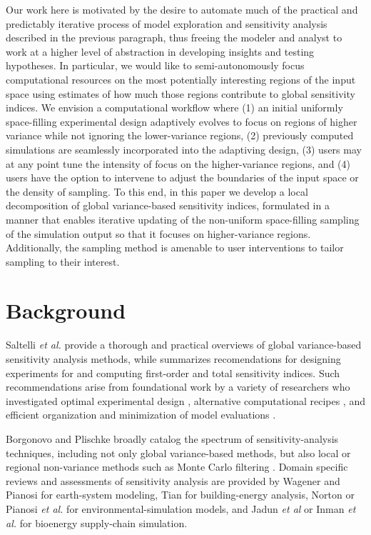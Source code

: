\documentclass[12pt]{article}
\begin{document}
Our work here is motivated by the desire to automate much of the practical and predictably iterative process of model exploration and sensitivity analysis described in the previous paragraph, thus freeing the modeler and analyst to work at a higher level of abstraction in developing insights and testing hypotheses. In particular, we would like to semi-autonomously focus computational resources on the most potentially interesting regions of the input space using estimates of how much those regions contribute to global sensitivity indices. We envision a computational workflow where (1) an initial uniformly space-filling experimental design adaptively evolves to focus on regions of higher variance while not ignoring the lower-variance regions, (2) previously computed simulations are seamlessly incorporated into the adaptiving design, (3) users may at any point tune the intensity of focus on the higher-variance regions, and (4) users have the option to intervene to adjust the boundaries of the input space or the density of sampling. To this end, in this paper we develop a local decomposition of global variance-based sensitivity indices, formulated in a manner that enables iterative updating of the non-uniform space-filling sampling of the simulation output so that it focuses on higher-variance regions. Additionally, the sampling method is amenable to user interventions to tailor sampling to their interest.


\section{Background}
\label{sec:back}

Saltelli \textit{et al.} \cite{saltelli_sensitivity_2004} \cite{saltelli_global_2008} provide a thorough and practical overviews of global variance-based sensitivity analysis methods, while \cite{saltelli_variance_2010} summarizes recomendations for designing experiments for and computing first-order and total sensitivity indices. Such recommendations arise from foundational work by a variety of researchers who investigated optimal experimental design \cite{jansen_analysis_1999} \cite{saltelli_variance_2010}, alternative computational recipes \cite{saltelli_variance_2010}, and efficient organization and minimization of model evaluations \cite{saltelli_making_2002} \cite{piano_new_2019} \cite{kucherenko_estimation_2012}.

Borgonovo and Plischke \cite{borgonovo_sensitivity_2016} broadly catalog the spectrum of sensitivity-analysis techniques, including not only global variance-based methods, but also local or regional non-variance methods such as Monte Carlo filtering \cite{wu_application_2017}. Domain specific reviews and assessments of sensitivity analysis are provided by Wagener and Pianosi \cite{wagener_what_2019} for earth-system modeling, Tian \cite{tian_review_2013} for building-energy analysis, Norton \cite{norton_introduction_2015} or Pianosi \textit{et al.} \cite{pianosi_sensitivity_2016} for environmental-simulation models, and Jadun \textit{et al} \cite{jadun_application_2017} or Inman \textit{et al.} \cite{inman_application_2018} for bioenergy supply-chain simulation.
\end{document}
